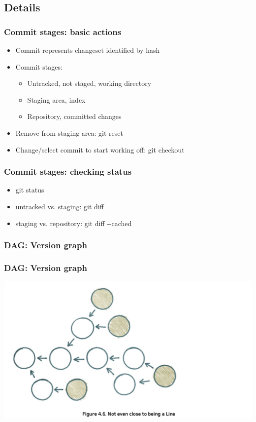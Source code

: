 \documentclass{beamer}
\begin{document}
		\subsection{Details}
		\begin{frame}
      \frametitle{Commit stages: basic actions}
			\begin{center}
			\begin{itemize}
        \item Commit represents changeset identified by hash
        \item Commit stages:
			  \begin{itemize}
            \item Untracked, not staged, working directory 
            \item Staging area, index 
            \item Repository, committed changes
        \end{itemize}
        \item Remove from staging area: git reset
        \item Change/select commit to start working off: git checkout
			\end{itemize}
			\end{center}
		\end{frame}

		\begin{frame}
      \frametitle{Commit stages: checking status}
			\begin{center}
			\begin{itemize}
        \item git status
        \item untracked vs. staging: git diff
        \item staging vs. repository: git diff -{}-cached
			\end{itemize}
			\end{center}
		\end{frame}

		\subsubsection{DAG: Version graph}
		\begin{frame}
			\frametitle{DAG: Version graph}
			\begin{center}
				\includegraphics[scale=0.3]{images/dag}
			\end{center}
		\end{frame}
\end{document}
